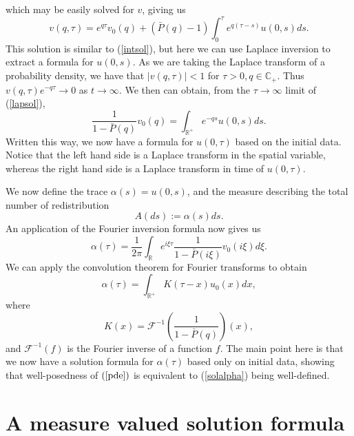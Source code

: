 which may be  easily solved for $v$, giving us
\begin{equation}\label{lapsol}
v(q,\tau) = e^{q\tau}v_0(q)+(\bar P(q)-1)\int_0^\tau e^{q(\tau-s)}u(0,s)ds.
\end{equation}
This solution is similar to (\ref{intsol}), but here we can use Laplace inversion to extract a formula for $u(0,s)$.  As we are taking the Laplace transform of a probability density, we have that $|v(q,\tau)|<1$ for $\tau>0, q \in \mathbb{C}_+$. Thus $v(q,\tau)e^{-q\tau} \rightarrow 0$ as $t\rightarrow \infty$.  We then can obtain, from the $\tau\rightarrow \infty$ limit of (\ref{lapsol}),
\begin{equation}\label{fpreinv}
\frac{1}{1-\bar P(q)}v_0(q) = \int_{\mathbb{R^+}}e^{-qs}u(0,s)ds. \nonumber
\end{equation}
Written this way, we now have a formula for $u(0,\tau)$ based on the initial data.
Notice that the left hand side is a Laplace transform in the spatial variable, whereas the right hand side is a Laplace transform in time of $u(0,\tau)$. 

We now define  the trace $\alpha(s) = u(0,s)$, and the measure describing the total number of redistribution
\begin{equation}
 A(ds) := \alpha(s)ds.\nonumber
\end{equation}
An application of the Fourier inversion formula now gives us 
 \begin{equation}\label{solalpha}
\alpha(\tau) = \frac 1{2\pi}\int_\mathbb{R} e^{i\xi \tau} \frac {1}{1-\bar P(i\xi)} v_0(i\xi)d\xi.
\end{equation} 
We can apply the convolution theorem for Fourier transforms to obtain
\begin{equation}\label{alphainit}
\alpha(\tau) = \int_{\mathbb{R}^+}K(\tau-x)u_0(x)dx,
\end{equation}
where 
\begin{equation}
K(x) = \mathcal F^{-1}\left(\frac{1}{1-\bar P(q)}\right)(x),\nonumber
\end{equation}and $\mathcal F^{-1}(f)$ is the Fourier inverse of a function $f$.
The main point here is that we now have a solution formula for $\alpha(\tau)$ based only on initial data, showing that well-posedness of $(\ref{pde})$ is equivalent to   (\ref{solalpha}) being well-defined. 
\section{A measure valued solution formula }\label{meassect}


